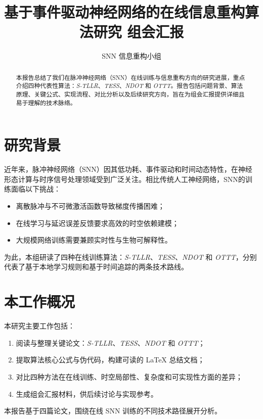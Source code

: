 \documentclass[journal,12pt,onecolumn]{IEEEtran}
\begin{document}
\title{基于事件驱动神经网络的在线信息重构算法研究 组会汇报}
\author{SNN 信息重构小组}
\maketitle

\begin{abstract}
本报告总结了我们在脉冲神经网络（SNN）在线训练与信息重构方向的研究进展，重点介绍四种代表性算法：\textit{S-TLLR}、\textit{TESS}、\textit{NDOT} 和 \textit{OTTT}。报告包括问题背景、算法原理、关键公式、实现流程、对比分析以及后续研究方向，旨在为组会汇报提供详细且易于理解的技术脉络。
\end{abstract}

\section{研究背景}
近年来，脉冲神经网络（SNN）因其低功耗、事件驱动和时间动态特性，在神经形态计算与时序信号处理领域受到广泛关注。相比传统人工神经网络，SNN的训练面临以下挑战：
\begin{itemize}
  \item 离散脉冲与不可微激活函数导致梯度传播困难；
  \item 在线学习与延迟误差反馈要求高效的时空依赖建模；
  \item 大规模网络训练需要兼顾实时性与生物可解释性。
\end{itemize}

为此，本组研读了四种在线训练算法：\textit{S-TLLR}、\textit{TESS}、\textit{NDOT} 和 \textit{OTTT}，分别代表了基于本地学习规则和基于时间追踪的两条技术路线。

\section{本工作概况}
本研究主要工作包括：
\begin{enumerate}
  \item 阅读与整理关键论文：\textit{S-TLLR}、\textit{TESS}、\textit{NDOT} 和 \textit{OTTT}；
  \item 提取算法核心公式与伪代码，构建可读的 LaTeX 总结文档；
  \item 对比四种方法在在线训练、时空局部性、复杂度和可实现性方面的差异；
  \item 生成组会汇报材料，供后续讨论与实现参考。
\end{enumerate}

本报告基于四篇论文，围绕在线 SNN 训练的不同技术路径展开分析。
\end{document}
